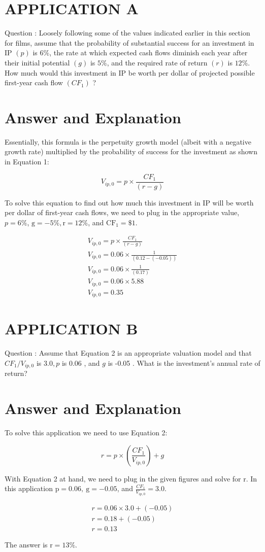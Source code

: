 \documentclass[11pt]{article}
\begin{document}
\section*{APPLICATION A}
Question : Loosely following some of the values indicated earlier in this section for films, assume that the probability of substantial success for an investment in IP $(p)$ is $6 \%$, the rate at which expected cash flows diminish each year after their initial potential $(g)$ is $5 \%$, and the required rate of return $(r)$ is $12 \%$. How much would this investment in IP be worth per dollar of projected possible first-year cash flow $\left(C F_{1}\right)$ ?

\section*{Answer and Explanation}
Essentially, this formula is the perpetuity growth model (albeit with a negative growth rate) multiplied by the probability of success for the investment as shown in Equation 1:

$$
V_{i p, 0}=p \times \frac{C F_{1}}{(r-g)}
$$

To solve this equation to find out how much this investment in IP will be worth per dollar of first-year cash flows, we need to plug in the appropriate value, $p=6 \%$, $\mathrm{g}=-5 \%, \mathrm{r}=12 \%$, and $\mathrm{CF}_{1}=\$ 1$.

$$
\begin{gathered}
V_{i p, 0}=p \times \frac{C F_{1}}{(r-g)} \\
V_{i p, 0}=0.06 \times \frac{1}{(0.12-(-0.05))} \\
V_{i p, 0}=0.06 \times \frac{1}{(0.17)} \\
V_{i p, 0}=0.06 \times 5.88 \\
V_{i p, 0}=0.35
\end{gathered}
$$

\section*{APPLICATION B}
Question : Assume that Equation 2 is an appropriate valuation model and that $C F_{1} / V_{i p, 0}$ is $3.0, p$ is 0.06 , and $g$ is -0.05 . What is the investment's annual rate of return?

\section*{Answer and Explanation}
To solve this application we need to use Equation 2:

$$
r=p \times\left(\frac{C F_{1}}{V_{i p, 0}}\right)+g
$$

With Equation 2 at hand, we need to plug in the given figures and solve for $\mathrm{r}$. In this application $\mathrm{p}=0.06, \mathrm{~g}=-0.05$, and $\frac{C F_{1}}{V_{i p, 0}}=3.0$.

$$
\begin{gathered}
r=0.06 \times 3.0+(-0.05) \\
r=0.18+(-0.05) \\
r=0.13
\end{gathered}
$$

The answer is $\mathrm{r}=13 \%$.
\end{document}

